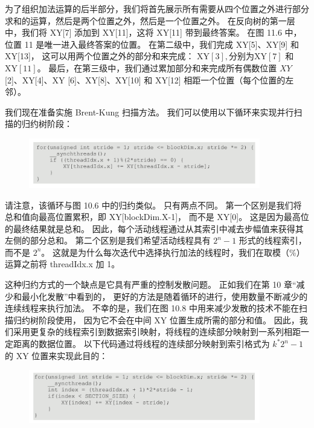为了组织加法运算的后半部分，我们将首先展示所有需要从四个位置之外进行部分求和的运算，然后是两个位置之外，然后是一个位置之外。 
在反向树的第一层中，我们将 XY[7] 添加到 XY[11]，这将 XY[11] 带到最终答案。 
在图 11.6 中，位置 11 是唯一进入最终答案的位置。 
在第二级中，我们完成 XY[5]、XY[9] 和 XY[13]，
这可以用两个位置之外的部分和来完成： $\mathrm{XY}[3], \mathrm{ 分别为 XY}[7]$ 和 $\mathrm{XY}[11]$。 
最后，在第三级中，我们通过累加部分和来完成所有偶数位置 $X Y$ [2]、XY[4]、XY [6]、XY[8]、XY[10] 和 XY[12] 相距一个位置（每个位置的左邻）。

我们现在准备实施 Brent-Kung 扫描方法。 我们可以使用以下循环来实现并行扫描的归约树阶段：

\begin{figure}[H]
	\centering
	\includegraphics[width=0.9\textwidth]{figs/F11-a2.png}
\end{figure}

请注意，该循环与图 10.6 中的归约类似。 只有两点不同。 第一个区别是我们将总和值向最高位置累积，即 XY[blockDim.X-1]，
而不是 XY[0]。 这是因为最高位的最终结果就是总和。 因此，每个活动线程通过从其索引中减去步幅值来获得其左侧的部分总和。 
第二个区别是我们希望活动线程具有 $2^{n}-1$ 形式的线程索引，而不是 $2^{n}$。 
这就是为什么每次迭代中选择执行加法的线程时，我们在取模（\%）运算之前将 threadIdx.x 加 1。

这种归约方式的一个缺点是它具有严重的控制发散问题。 正如我们在第 10 章“减少和最小化发散”中看到的，
更好的方法是随着循环的进行，使用数量不断减少的连续线程来执行加法。 
不幸的是，我们在图 10.8 中用来减少发散的技术不能在扫描归约树阶段使用，
因为它不会在中间 $\mathrm{XY}$ 位置生成所需的部分和值。 
因此，我们采用更复杂的线程索引到数据索引映射，将线程的连续部分映射到一系列相距一定距离的数据位置。 
以下代码通过将线程的连续部分映射到索引格式为 $k^{*} 2^{n}-1$ 的 XY 位置来实现此目的：

\begin{figure}[H]
	\centering
	\includegraphics[width=0.9\textwidth]{figs/F11-a3.png}
\end{figure}

